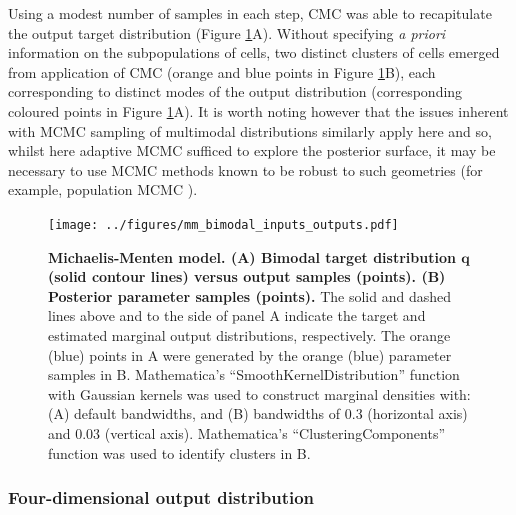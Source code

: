 Using a modest number of samples in each step, CMC was able to recapitulate the output target distribution (Figure \ref{fig:mm_bimodal_inputs_outputs}A). Without specifying \textit{a priori} information on the subpopulations of cells, two distinct clusters of cells emerged from application of CMC (orange and blue points in Figure \ref{fig:mm_bimodal_inputs_outputs}B), each corresponding to distinct modes of the output distribution (corresponding coloured points in Figure \ref{fig:mm_bimodal_inputs_outputs}A). It is worth noting however that the issues inherent with MCMC sampling of multimodal distributions similarly apply here and so, whilst here adaptive MCMC \cite{johnstone2016uncertainty} sufficed to explore the posterior surface, it may be necessary to use MCMC methods known to be robust to such geometries (for example, population MCMC \cite{jasra2007population}).

\begin{figure}[H]
\centerline{\texttt{[image: ../figures/mm\_bimodal\_inputs\_outputs.pdf]}}
\caption{\textbf{Michaelis-Menten model. (A) Bimodal target distribution $\boldsymbol{q}$ (solid contour lines) versus output samples (points). (B) Posterior parameter samples (points).} The solid and dashed lines above and to the side of panel A indicate the target and estimated marginal output distributions, respectively. The orange (blue) points in A were generated by the orange (blue) parameter samples in B. %
Mathematica's ``SmoothKernelDistribution'' function \cite{mathematica} with Gaussian kernels was used to construct marginal densities with: (A) default bandwidths, and (B) bandwidths of 0.3 (horizontal axis) and 0.03 (vertical axis). Mathematica's ``ClusteringComponents'' function \cite{mathematica} was used to identify clusters %
in B.}
\label{fig:mm_bimodal_inputs_outputs}
\end{figure}

\subsubsection{Four-dimensional output distribution}

